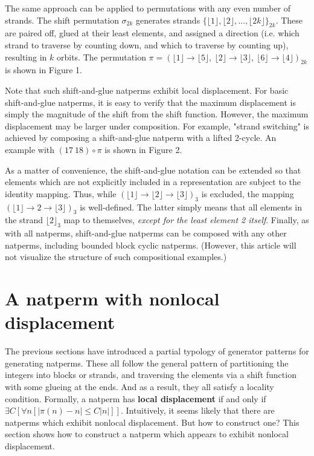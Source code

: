 \documentclass[12pt,reqno]{article}
\begin{document}
The same approach can be applied to permutations with any even number of strands. The shift permutation $\sigma_{2k}$ generates strands $\{ \lfloor 1 \rfloor,  \lfloor 2 \rfloor, \ldots, \lfloor 2k \rfloor \}_{2k}$. These are paired off, glued at their least elements, and assigned a direction (i.e. which strand to traverse by counting down, and which to traverse by counting up), resulting in $k$ orbits. The permutation $\pi = {( \lfloor 1 \rfloor \rightarrow \lfloor 5 \rfloor, \ \lfloor 2 \rfloor \rightarrow \lfloor 3 \rfloor, \ \lfloor 6 \rfloor \rightarrow \lfloor 4 \rfloor )}_{2k}$ is shown in Figure 1. %


Note that such shift-and-glue natperms exhibit local displacement. For basic shift-and-glue natperms, it is easy to verify that the maximum displacement is simply the magnitude of the shift from the shift function. However, the maximum displacement may be larger under composition. For example, "strand switching" is achieved by composing a shift-and-glue natperm with a lifted 2-cycle. An example with $(17 \ 18) \circ \pi$ is shown in Figure 2.


As a matter of convenience, the shift-and-glue notation can be extended so that elements which are not explicitly included in a representation are subject to the identity mapping. Thus, while  ${( \lfloor 1 \rfloor \rightarrow \lfloor 2 \rfloor \rightarrow \lfloor 3 \rfloor)}_3$ is excluded, the mapping ${( \lfloor 1 \rfloor \rightarrow 2 \rightarrow \lfloor 3 \rfloor )}_3$ is well-defined. The latter simply means that all elements in the strand ${\lfloor 2 \rfloor}_3$ map to themselves, \textit{except for the least element 2 itself}. Finally, as with all natperms, shift-and-glue natperms can be composed with any other natperms, including bounded block cyclic natperms. (However, this article will not visualize the structure of such compositional examples.)

\section{A natperm with nonlocal displacement}

The previous sections have introduced a partial typology of generator patterns for generating natperms. These all follow the general pattern of partitioning the integers into blocks or strands, and traversing the elements via a shift function with some glueing at the ends. And as a result, they all satisfy a locality condition. Formally, a natperm has \textbf{local displacement} if and only if $\exists C [\forall n [|\pi(n) - n| \leq C|n|]]$. Intuitively, it seems likely that there are natperms which exhibit nonlocal displacement. But how to construct one? This section shows how to construct a natperm which appears to exhibit nonlocal displacement.
\end{document}
